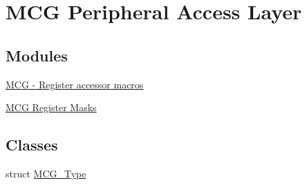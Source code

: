 \hypertarget{group__MCG__Peripheral__Access__Layer}{}\section{M\+CG Peripheral Access Layer}
\label{group__MCG__Peripheral__Access__Layer}
\subsection*{Modules}
\begin{DoxyCompactItemize}
\item 
\hyperlink{group__MCG__Register__Accessor__Macros}{M\+C\+G -\/ Register accessor macros}
\item 
\hyperlink{group__MCG__Register__Masks}{M\+C\+G Register Masks}
\end{DoxyCompactItemize}
\subsection*{Classes}
\begin{DoxyCompactItemize}
\item 
struct \hyperlink{structMCG__Type}{M\+C\+G\+\_\+\+Type}
\end{DoxyCompactItemize}
